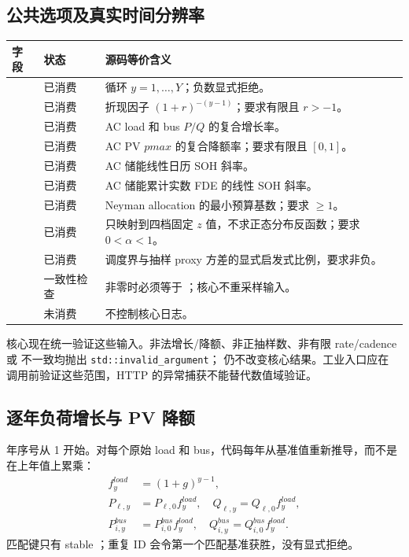 \subsection{公共选项及真实时间分辨率}
\begin{longtable}{@{}L{4.2cm}L{2.3cm}L{7.1cm}@{}}
\toprule
字段 & 状态 & 源码等价含义\\ \midrule
{} & 已消费 & 循环 $y=1,\ldots,Y$；负数显式拒绝。\\
 & 已消费 & 折现因子 $(1+r)^{-(y-1)}$；要求有限且 $r>-1$。\\
 & 已消费 & AC load 和 bus $P/Q$ 的复合增长率。\\
 & 已消费 & AC PV $pmax$ 的复合降额率；要求有限且 $[0,1]$。\\
 & 已消费 & AC 储能线性日历 SOH 斜率。\\
 & 已消费 & AC 储能累计实数 FDE 的线性 SOH 斜率。\\
 & 已消费 & Neyman allocation 的最小预算基数；要求 $\ge1$。\\
 & 已消费 & 只映射到四档固定 $z$ 值，不求正态分布反函数；要求 $0<\alpha<1$。\\
 & 已消费 & 调度界与抽样 proxy 方差的显式启发式比例，要求非负。\\
 & 一致性检查 & 非零时必须等于 ；核心不重采样输入。\\
 & 未消费 & 不控制核心日志。\\
\bottomrule
\end{longtable}

核心现在统一验证这些输入。非法增长/降额、非正抽样数、非有限 rate/cadence 或
 不一致均抛出 \texttt{std::invalid\_argument}；
 仍不改变核心结果。工业入口应在
调用前验证这些范围，HTTP 的异常捕获不能替代数值域验证。

\subsection{逐年负荷增长与 PV 降额}
年序号从 1 开始。对每个原始 load 和 bus，代码每年从基准值重新推导，而不是在上年值上累乘：
\begin{align}
 f_y^{load}&=(1+g)^{y-1},\\
 P_{\ell,y}&=P_{\ell,0}f_y^{load},\quad
 Q_{\ell,y}=Q_{\ell,0}f_y^{load},\\
 P_{i,y}^{bus}&=P_{i,0}^{bus}f_y^{load},\quad
 Q_{i,y}^{bus}=Q_{i,0}^{bus}f_y^{load}.
\end{align}
匹配键只有 stable ；重复 ID 会令第一个匹配基准获胜，没有显式拒绝。

